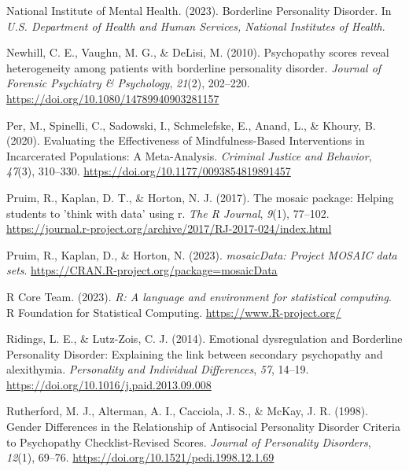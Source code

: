 \documentclass[
  man,floatsintext]{apa7}
\newlength{\cslhangindent}
\newlength{\cslentryspacingunit} %
\newenvironment{CSLReferences}[2] %
 {%
  \setlength{\parindent}{0pt}
  \ifodd #1
  \let\oldpar\par
  \def\par{\hangindent=\cslhangindent\oldpar}
  \fi
  \setlength{\parskip}{#2\cslentryspacingunit}
 }%
 {}
\begin{document}
\begin{CSLReferences}{1}{0}
\leavevmode{}%
National Institute of Mental Health. (2023). Borderline {Personality Disorder}. In \emph{U.S. Department of Health and Human Services, National Institutes of Health}.

\leavevmode{}%
Newhill, C. E., Vaughn, M. G., \& DeLisi, M. (2010). Psychopathy scores reveal heterogeneity among patients with borderline personality disorder. \emph{Journal of Forensic Psychiatry \& Psychology}, \emph{21}(2), 202--220. \url{https://doi.org/10.1080/14789940903281157}

\leavevmode{}%
Per, M., Spinelli, C., Sadowski, I., Schmelefske, E., Anand, L., \& Khoury, B. (2020). Evaluating the {Effectiveness} of {Mindfulness-Based Interventions} in {Incarcerated Populations}: {A Meta-Analysis}. \emph{Criminal Justice and Behavior}, \emph{47}(3), 310--330. \url{https://doi.org/10.1177/0093854819891457}

\leavevmode{}%
Pruim, R., Kaplan, D. T., \& Horton, N. J. (2017). The mosaic package: Helping students to 'think with data' using r. \emph{The R Journal}, \emph{9}(1), 77--102. \url{https://journal.r-project.org/archive/2017/RJ-2017-024/index.html}

\leavevmode{}%
Pruim, R., Kaplan, D., \& Horton, N. (2023). \emph{mosaicData: Project MOSAIC data sets}. \url{https://CRAN.R-project.org/package=mosaicData}

\leavevmode{}%
R Core Team. (2023). \emph{R: A language and environment for statistical computing}. R Foundation for Statistical Computing. \url{https://www.R-project.org/}

\leavevmode{}%
Ridings, L. E., \& Lutz-Zois, C. J. (2014). Emotional dysregulation and {Borderline Personality Disorder}: {Explaining} the link between secondary psychopathy and alexithymia. \emph{Personality and Individual Differences}, \emph{57}, 14--19. \url{https://doi.org/10.1016/j.paid.2013.09.008}

\leavevmode{}%
Rutherford, M. J., Alterman, A. I., Cacciola, J. S., \& McKay, J. R. (1998). Gender {Differences} in the {Relationship} of {Antisocial Personality Disorder Criteria} to {Psychopathy Checklist-Revised Scores}. \emph{Journal of Personality Disorders}, \emph{12}(1), 69--76. \url{https://doi.org/10.1521/pedi.1998.12.1.69}


\end{CSLReferences}
\end{document}
